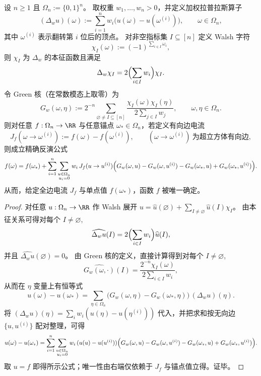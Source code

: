 
\begin{theorem}\label{thm:fold-hypercube-green-inversion-unique-reconstruction}
设 \(n\ge 1\) 且 \(\Omega_n:=\{0,1\}^n\)。
取权重 \(w_1,\dots,w_n>0\)，并定义加权拉普拉斯算子
\[
(\Delta_w u)(\omega):=\sum_{i=1}^n w_i\bigl(u(\omega)-u(\omega^{(i)})\bigr),
\qquad \omega\in\Omega_n,
\]
其中 \(\omega^{(i)}\) 表示翻转第 \(i\) 位后的顶点。
对非空指标集 \(I\subseteq[n]\) 定义 Walsh 字符
\[
\chi_I(\omega):=(-1)^{\sum_{i\in I}\omega_i},
\]
则 \(\chi_I\) 为 \(\Delta_w\) 的本征函数且满足
\[
\Delta_w\chi_I=2\Bigl(\sum_{i\in I}w_i\Bigr)\chi_I.
\]
令 Green 核（在常数模态上取零）为
\[
G_w(\omega,\eta):=2^{-n}\sum_{\varnothing\ne I\subseteq[n]}
\frac{\chi_I(\omega)\chi_I(\eta)}{2\sum_{j\in I}w_j},
\qquad \omega,\eta\in\Omega_n.
\]
则对任意 \(f:\Omega_n\to\RR\) 与任意锚点 \(\omega_\ast\in\Omega_n\)，若定义有向边电流
\[
J_f(\omega\to\omega^{(i)}):=f(\omega)-f(\omega^{(i)}),
\qquad (\omega\to\omega^{(i)})\ \text{为超立方体有向边},
\]
则成立精确反演公式
\[
f(\omega)
=f(\omega_\ast)
+\sum_{i=1}^n \sum_{\substack{u\in\Omega_n\\ u_i=0}}
w_i\,J_f(u\to u^{(i)})
\Bigl(
G_w(\omega,u)-G_w(\omega,u^{(i)})-G_w(\omega_\ast,u)+G_w(\omega_\ast,u^{(i)})
\Bigr).
\]
从而，给定全边电流 \(J_f\) 与单点值 \(f(\omega_\ast)\)，函数 \(f\) 被唯一确定。
\end{theorem}
\begin{proof}
对任意 \(u:\Omega_n\to\RR\) 作 Walsh 展开 \(u=\widehat u(\varnothing)+\sum_{I\ne\varnothing}\widehat u(I)\chi_I\)。
由本征关系可得对每个 \(I\ne\varnothing\),
\[
\widehat{\Delta_w u}(I)
=2\Bigl(\sum_{i\in I}w_i\Bigr)\widehat u(I),
\]
并且 \(\widehat{\Delta_w u}(\varnothing)=0\)。
由 Green 核的定义，直接计算得到对每个 \(I\ne\varnothing\),
\[
\widehat{G_w(\omega,\cdot)}(I)=\frac{2^{-n}\chi_I(\omega)}{2\sum_{i\in I}w_i},
\]
从而在 \(\eta\) 变量上有恒等式
\[
u(\omega)-u(\omega_\ast)
=\sum_{\eta\in\Omega_n}\bigl(G_w(\omega,\eta)-G_w(\omega_\ast,\eta)\bigr)\,(\Delta_w u)(\eta).
\]
将 \((\Delta_w u)(\eta)=\sum_i w_i(u(\eta)-u(\eta^{(i)}))\) 代入，并把求和按无向边 \(\{u,u^{(i)}\}\) 配对整理，可得
\[
u(\omega)-u(\omega_\ast)
=\sum_{i=1}^n \sum_{\substack{u\in\Omega_n\\ u_i=0}}
w_i\,(u(u)-u(u^{(i)}))
\Bigl(
G_w(\omega,u)-G_w(\omega,u^{(i)})-G_w(\omega_\ast,u)+G_w(\omega_\ast,u^{(i)})
\Bigr).
\]
取 \(u=f\) 即得所示公式；唯一性由右端仅依赖于 \(J_f\) 与锚点值立得。证毕。
\end{proof}

\endinput

